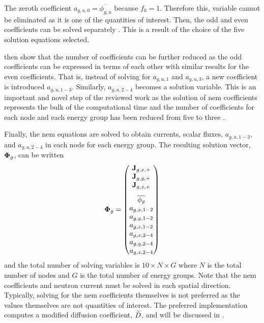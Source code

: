       The zeroth coefficient $a_{g,u,0} = \overline{\phi_{g,u}}$ because $f_0 =
      1$. Therefore this, variable cannot be eliminated as it is one of the
      quantities of interest. Then, the odd and even coefficients can be solved
      separately \cite{gehinThesis}. This is a result of the choice of the five
      solution equations selected. 

      \citeauthor{qe2paper} then show that the number of coefficients can be
      further reduced as the odd coefficients can be expressed in terms of
      each other with similar results for the even coefficients. That is,
      instead of solving for $a_{g,u,1}$ and $a_{g,u,3}$, a new coefficient is
      introduced $a_{g,u,1-3}$. Similarly, $a_{g,u,2-4}$ becomes a solution
      variable. This is an important and novel step of the reviewed work as the
      solution of \gls{nem} coefficients represents the bulk of the
      computational time and the number of coefficients for each node and each
      energy group has been reduced from five to three
      \cite{qe2paper}.

      Finally, the \gls{nem} equations are solved to obtain currents, scalar
      fluxes, $a_{g,u,1-3}$, and $a_{g,u,2-4}$ in each node for each energy
      group. The resulting solution vector, $\mathbf{\Phi}_g$, can be written 
      \begin{equation}
        \label{eq:solution_vector}
        \vPhi_g =
        \begin{pmatrix}
          \current_{g,x,+} \\
          \current_{g,y,+} \\
          \vspace{8pt}
          \current_{g,z,+} \\
          \overline{\phi_g} \\
          a_{g,x,1-2} \\
          a_{g,y,1-2} \\
          a_{g,z,1-2} \\
          a_{g,x,2-4} \\
          a_{g,y,2-4} \\
          a_{g,z,2-4}
        \end{pmatrix}
      \end{equation}
      and the total number of solving variables is $10 \times N \times G$ where
      $N$ is the total number of nodes and $G$ is the total number of energy
      groups. Note that the \gls{nem} coefficients and neutron current must be
      solved in each spatial direction. Typically, solving for the \gls{nem}
      coefficients themselves is not preferred as the values themselves are not
      quantities of interest.  The preferred implementation computes a modified
      diffusion coefficient, $\widetilde{D}$, and will be discussed in
      .

